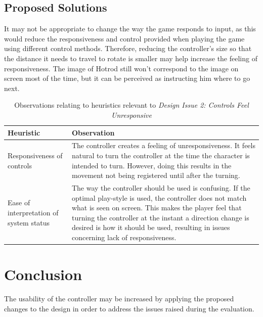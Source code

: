 \documentclass{scrartcl}
\begin{document}
\subsection{Proposed Solutions}
It may not be appropriate to change the way the game responds to input, as this would reduce the responsiveness and control provided when playing the game using different control methods. Therefore, reducing the controller's size so that the distance it needs to travel to rotate is smaller may help increase the feeling of responsiveness. The image of Hotrod still won't correspond to the image on screen most of the time, but it can be perceived as instructing him where to go next.

\begin{table}[h]
\centering
\begin{tabular}{| l | p{6cm} |}
\hline
\textbf{Heuristic} & \textbf{Observation} \\ \hline
Responsiveness of controls
 & The controller creates a feeling of unresponsiveness. It feels natural to turn the controller at the time the character is intended to turn. However, doing this results in the movement not being registered until after the turning. \\ \hline
Ease of interpretation of system status
 & The way the controller should be used is confusing. If the optimal play-style is used, the controller does not match what is seen on screen. This makes the player feel that turning the controller at the instant a direction change is desired is how it should be used, resulting in issues concerning lack of responsiveness. \\ \hline
\end{tabular}
\caption{Observations relating to heuristics relevant to \textit{Design Issue 2: Controls Feel Unresponsive}}
\label{table:issue2}
\end{table}

\section{Conclusion}
The usability of the controller may be increased by applying the proposed changes to the design in order to address the issues raised during the evaluation.



\end{document}
